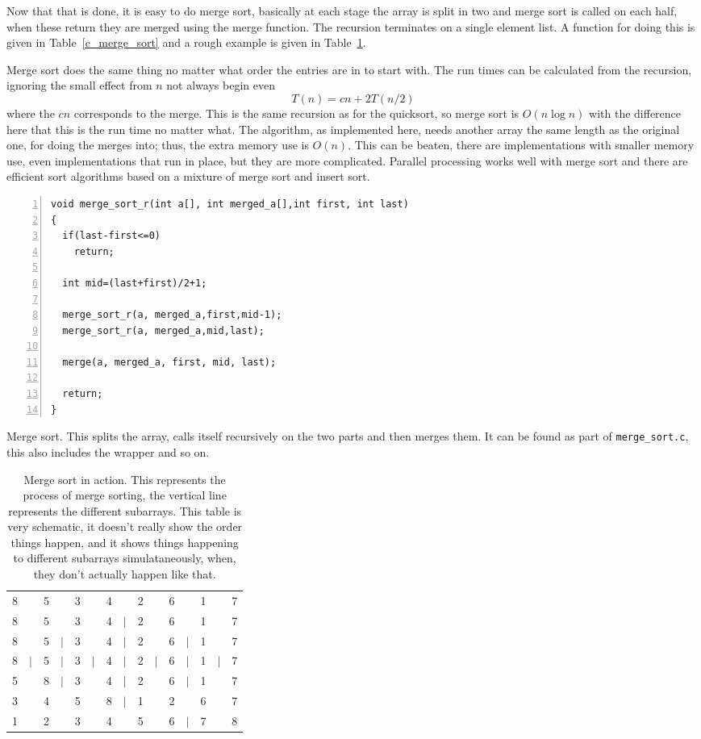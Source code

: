 \documentclass[11pt,a4paper]{scrartcl}
\begin{document}
Now that that is done, it is easy to do merge sort, basically at each
stage the array is split in two and merge sort is called on each half,
when these return they are merged using the merge function. The
recursion terminates on a single element list. A function for doing
this is given in Table~\ref{c_merge_sort} and a rough example is given
in Table~\ref{table_merge_sort}.

Merge sort does the same thing no matter what order the entries are in
to start with. The run times can be calculated from the recursion,
ignoring the small effect from $n$ not always begin even
\begin{equation}
T(n)=cn+2T(n/2)
\end{equation}
where the $cn$ corresponds to the merge. This is the same recursion as
for the quicksort, so merge sort is $O(n\log{n})$ with the difference
here that this is the run time no matter what. The algorithm, as
implemented here, needs another array the same length as the original
one, for doing the merges into; thus, the extra memory use is
$O(n)$. This can be beaten, there are implementations with smaller
memory use, even implementations that run in place, but they are more
complicated. Parallel processing works well with merge sort and there
are efficient sort algorithms based on a mixture of merge sort and
insert sort.

\begin{table}
\begin{lstlisting}[numbers=left]
void merge_sort_r(int a[], int merged_a[],int first, int last)
{
  if(last-first<=0)
    return;

  int mid=(last+first)/2+1;

  merge_sort_r(a, merged_a,first,mid-1);
  merge_sort_r(a, merged_a,mid,last);

  merge(a, merged_a, first, mid, last);

  return;
}
\end{lstlisting}
\caption{Merge sort. This splits the array, calls itself recursively
  on the two parts and then merges them. It can be found as part of
  {\tt merge\_sort.c}, this also includes the wrapper and so
  on. \label{c_merge_sort}}
\end{table}


\begin{table}
\begin{tabular}{ccccccccccccccc}
8&&5&&3&&4&&2&&6&&1&&7\\
8&&5&&3&&4&$|$&2&&6&&1&&7\\
8&&5&$|$&3&&4&$|$&2&&6&$|$&1&&7\\
8&$|$&5&$|$&3&$|$&4&$|$&2&$|$&6&$|$&1&$|$&7\\
5&&8&$|$&3&&4&$|$&2&&6&$|$&1&&7\\
3&&4&&5&&8&$|$&1&&2&&6&&7\\
1&&2&&3&&4&&5&&6&$|$&7&&8
\end{tabular}
\caption{Merge sort in action. This represents the process of merge
  sorting, the vertical line represents the different subarrays. This
  table is very schematic, it doesn't really show the order things
  happen, and it shows things happening to different subarrays
  simulataneously, when, they don't actually happen like
  that.\label{table_merge_sort}}
\end{table}
\end{document}
